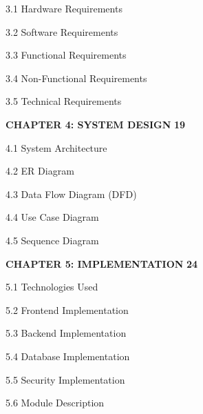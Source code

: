 \documentclass[12pt,a4paper]{report}
\begin{document}
\hspace{1.5em} 3.1 Hardware Requirements 

\hspace{1.5em} 3.2 Software Requirements 

\hspace{1.5em} 3.3 Functional Requirements 

\hspace{1.5em} 3.4 Non-Functional Requirements 

\hspace{1.5em} 3.5 Technical Requirements 

\vspace{8pt}

\noindent \textbf{CHAPTER 4: SYSTEM DESIGN} \dotfill \textbf{19}

\hspace{1.5em} 4.1 System Architecture 

\hspace{1.5em} 4.2 ER Diagram 

\hspace{1.5em} 4.3 Data Flow Diagram (DFD) 

\hspace{1.5em} 4.4 Use Case Diagram 

\hspace{1.5em} 4.5 Sequence Diagram 

\vspace{8pt}

\noindent \textbf{CHAPTER 5: IMPLEMENTATION} \dotfill \textbf{24}

\hspace{1.5em} 5.1 Technologies Used 

\hspace{1.5em} 5.2 Frontend Implementation 

\hspace{1.5em} 5.3 Backend Implementation 

\hspace{1.5em} 5.4 Database Implementation 

\hspace{1.5em} 5.5 Security Implementation 

\hspace{1.5em} 5.6 Module Description 

\vspace{8pt}
\end{document}
